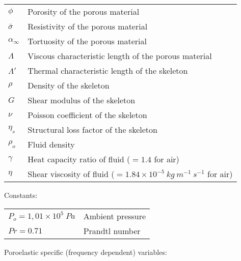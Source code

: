 \begin{tabular}{ll}
        $\phi$                                                  & Porosity of the porous material\\
        $\bar{\sigma}$                                  & Resistivity of the porous material\\
        $\alpha_\infty$                         & Tortuosity of the porous material\\
        $\Lambda$                                               & Viscous characteristic length of the porous material\\
        $\Lambda'$                                              & Thermal characteristic length of the skeleton\\
        $\rho$                                                  & Density of the skeleton\\
        $G$                                                             & Shear modulus of the skeleton\\
        $\nu$                                                           & Poisson coefficient of the skeleton\\
        $\eta_s$                                                        & Structural loss factor of the skeleton\\
        $\rho_o$                                                        & Fluid density\\
        $\gamma$                                                        & Heat capacity ratio of fluid ($=1.4$ for air)\\
        $\eta$                                                  & Shear viscosity of fluid ($=1.84\times10^{-5}\ kg\ m^{-1} \ s^{-1}$ for air)\\
\end{tabular}

Constants:\\

\begin{tabular}{ll}
        $P_o=1,01\times 10^5\ Pa$                                                                       & Ambient pressure\\
        $Pr=0.71$                                                                                                               & Prandtl number\\
\end{tabular}

Poroelastic specific (frequency dependent) variables:\\

